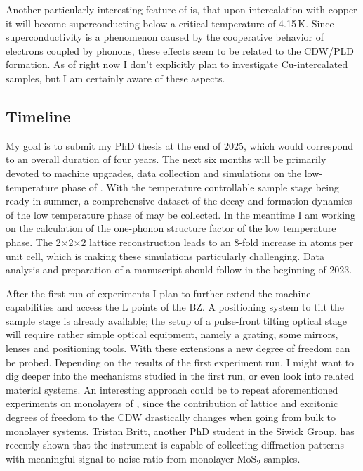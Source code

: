 Another particularly interesting feature of \ts\space is, that upon intercalation with copper it will become superconducting below a critical temperature of 4.15\,K\cite{morosan2006}.
Since superconductivity is a phenomenon caused by the cooperative behavior of electrons coupled by phonons, these effects seem to be related to the \ac{CDW}/\ac{PLD} formation.
As of right now I don't explicitly plan to investigate Cu-intercalated samples, but I am certainly aware of these aspects.

\subsection*{Timeline}
My goal is to submit my PhD thesis at the end of 2025, which would correspond to an overall duration of four years.
The next six months will be primarily devoted to machine upgrades, data collection and simulations on the low-temperature phase of \ts.
With the temperature controllable sample stage being ready in summer, a comprehensive dataset of the decay and formation dynamics of the low temperature phase of \ts\space may be collected.
In the meantime I am working on the calculation of the one-phonon structure factor of the low temperature phase.
The 2$\times$2$\times$2 lattice reconstruction leads to an 8-fold increase in atoms per unit cell, which is making these simulations particularly challenging.
Data analysis and preparation of a manuscript should follow in the beginning of 2023.

After the first run of experiments I plan to further extend the machine capabilities and access the L points of the \ac{BZ}.
A positioning system to tilt the sample stage is already available; the setup of a pulse-front tilting optical stage will require rather simple optical equipment, namely a grating, some mirrors, lenses and positioning tools.
With these extensions a new degree of freedom can be probed.
Depending on the results of the first experiment run, I might want to dig deeper into the mechanisms studied in the first run, or even look into related material systems.
An interesting approach could be to repeat aforementioned experiments on monolayers of \ts, since the contribution of lattice and excitonic degrees of freedom to the \ac{CDW} drastically changes when going from bulk to monolayer systems.
Tristan Britt, another PhD student in the Siwick Group, has recently shown that the instrument is capable of collecting diffraction patterns with meaningful signal-to-noise ratio from monolayer MoS\textsubscript{2} samples.